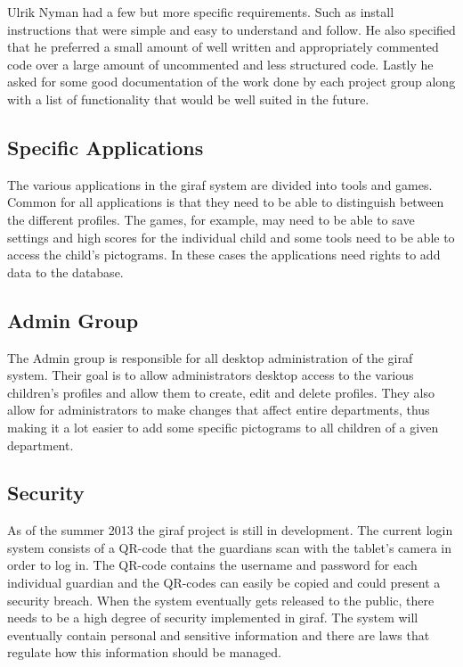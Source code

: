 Ulrik Nyman had a few but more specific requirements. Such as install instructions that were simple and easy to understand and follow. He also specified that he preferred a small amount of well written and appropriately commented code over a large amount of uncommented and less structured code. Lastly he asked for some good documentation of the work done by each project group along with a list of functionality that would be well suited in the future. 

\subsection{Specific Applications}
\label{sub:specific_applications}
The various applications in the \ac{giraf} system are divided into tools and games. Common for all applications is that they need to be able to distinguish between the different profiles. The games, for example, may need to be able to save settings and high scores for the individual child and some tools need to be able to access the child's pictograms. In these cases the applications need rights to add data to the database.  

\subsection{Admin Group} 
\label{sub:admin_group}
The Admin group is responsible for all desktop administration of the \ac{giraf} system. Their goal is to allow administrators desktop access to the various children's profiles and allow them to create, edit and delete profiles. They also allow for administrators to make changes that affect entire departments, thus making it a lot easier to add some specific pictograms to all children of a given department.   

\subsection{Security}
\label{sub:security}
As of the summer 2013 the \ac{giraf} project is still in development. The current login system consists of a QR-code that the guardians scan with the tablet's camera in order to log in. The QR-code contains the username and password for each individual guardian and the QR-codes can easily be copied and could present a security breach. When the system eventually gets released to the public, there needs to be a high degree of security implemented in \ac{giraf}. The system will eventually contain personal and sensitive information and there are laws that regulate how this information should be managed.  

